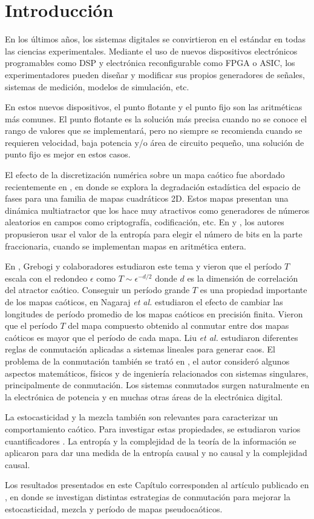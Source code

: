 \section{Introducción}

En los últimos años, los sistemas digitales se convirtieron en el estándar en todas las ciencias experimentales.
Mediante el uso de nuevos dispositivos electrónicos programables como DSP y electrónica reconfigurable como FPGA o ASIC, los experimentadores pueden diseñar y modificar sus propios generadores de señales, sistemas de medición, modelos de simulación, etc.

En estos nuevos dispositivos, el punto flotante y el punto fijo son las aritméticas más comunes.
El punto flotante es la solución más precisa cuando no se conoce el rango de valores que se implementará, pero no siempre se recomienda cuando se requieren velocidad, baja potencia y/o área de circuito pequeño, una solución de punto fijo es mejor en estos casos.

El efecto de la discretización numérica sobre un mapa caótico fue abordado recientemente en \cite{DeMicco2017}, en donde se explora la degradación estadística del espacio de fases para una familia de mapas cuadráticos 2D.
Estos mapas presentan una dinámica multiatractor que los hace muy atractivos como generadores de números aleatorios en campos como criptografía, codificación, etc. En \cite{Tlelo-Cuautle2016} y \cite{DelaFraga2017}, los autores propusieron usar el valor de la entropía para elegir el número de bits en la parte fraccionaria, cuando se implementan mapas en aritmética entera.

En \cite{Grebogi1988}, Grebogi y colaboradores estudiaron este tema y vieron que el período $T$ escala con el redondeo $\epsilon$ como $T\sim\epsilon^{-d/2}$ donde $d$ es la dimensión de correlación del atractor caótico.
Conseguir un período grande $T$ es una propiedad importante de los mapas caóticos, en \cite{Nagaraj2008} Nagaraj \textit{et al.} estudiaron el efecto de cambiar las longitudes de período promedio de los mapas caóticos en precisión finita.
Vieron que el período $T$ del mapa compuesto obtenido al conmutar entre dos mapas caóticos es mayor que el período de cada mapa.
Liu \textit{et al.} \cite{Liu2006} estudiaron diferentes reglas de conmutación aplicadas a sistemas lineales para generar caos.
El problema de la conmutación también se trató en \cite{Gluskin2008}, el autor consideró algunos aspectos matemáticos, físicos y de ingeniería relacionados con sistemas singulares, principalmente de conmutación.
Los sistemas conmutados surgen naturalmente en la electrónica de potencia y en muchas otras áreas de la electrónica digital.

La estocasticidad y la mezcla también son relevantes para caracterizar un comportamiento caótico.
Para investigar estas propiedades, se estudiaron varios cuantificadores \cite{DeMicco2009}.
La entropía y la complejidad de la teoría de la información se aplicaron para dar una medida de la entropía causal y no causal y la complejidad causal.

Los resultados presentados en este Capítulo corresponden al artículo publicado en \cite{Antonelli2018}, en donde se investigan distintas estrategias de conmutación para mejorar la estocasticidad, mezcla y período de mapas pseudocaóticos.